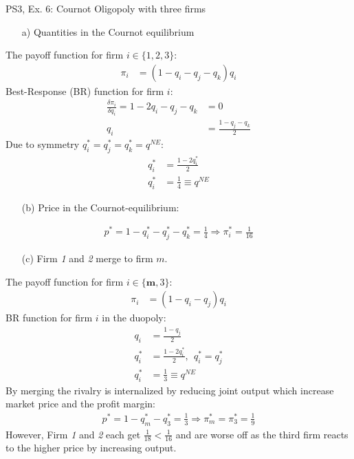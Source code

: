 \begin{frame}{PS3, Ex. 6: Cournot Oligopoly with three firms}
  \begin{multicols}{2}
    \begin{itemize}
      \item[a)] Quantities in the Cournot equilibrium
    \end{itemize}
    The payoff function for firm $i\in\{1,2,3\}$:
    \begin{align*}
        \pi_i&=(1-q_i-q_j-q_k)q_i
    \end{align*}
    Best-Response (BR) function for firm $i$:
    \begin{align*}
        \frac{\delta\pi_i}{\delta q_i}=1-2q_i-q_j-q_k&=0\\
                                                  q_i&=\frac{1-q_j-q_k}{2}
    \end{align*}
    Due to symmetry $q_i^{*}=q_j^{*}=q_k^{*}=q^{NE}$:
    \begin{align*}
        q_i^{*} &= \frac{1-2q_i^{*}}{2}\\
        q_i^{*} &= \frac{1}{4}\equiv q^{NE}
    \end{align*}
    \begin{itemize}
      \item[(b)] Price in the Cournot-equilibrium:
    \end{itemize}
    \begin{align*}
      p^{*}=1-q_i^{*}-q_j^{*}-q_k^{*}=\frac{1}{4}\Rightarrow\pi_i^{*}=\frac{1}{16}
    \end{align*}
  \vfill\null \columnbreak
    \begin{itemize}
      \item[(c)] Firm \textit{1} and \textit{2} merge to firm $m$.
    \end{itemize}
    The payoff function for firm $i\in\{\bm{m},3\}$:
    \begin{align*}
        \pi_i&=(1-q_i-q_j)q_i
    \end{align*}
    BR function for firm $i$ in the duopoly:
    \begin{align*}
        q_i&=\frac{1-q_j}{2}\\
        q_i^{*} &= \frac{1-2q_i^{*}}{2},\ \ q_i^{*}=q_j^{*}\\
        q_i^{*} &= \frac{1}{3}\equiv q^{NE}
    \end{align*}
    By merging the rivalry is internalized by reducing joint output which increase market price and the profit margin:
    \begin{align*}
      p^{*}=1-q_m^{*}-q_3^{*}=\frac{1}{3}\Rightarrow\pi_m^{*}=\pi_3^{*}=\frac{1}{9}
    \end{align*}
    However, Firm \textit{1} and \textit{2} each get $\frac{1}{18}<\frac{1}{16}$ and are worse off as the third firm reacts to the higher price by increasing output.
  \vfill\null
  \end{multicols}
\end{frame}
